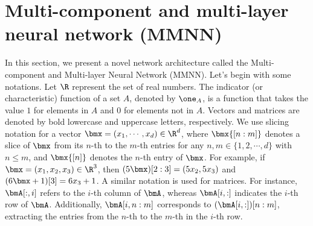 \documentclass[review,hidelinks,onefignum,onetabnum]{siamart250211}
\begin{document}




\section{Multi-component and multi-layer neural network (MMNN)}
\label{sec:MMNN}


In this section, we present a novel network architecture called the Multi-component and Multi-layer Neural Network (MMNN). 
Let's begin with some notations. Let $\R$ represent the set of real numbers. The indicator (or characteristic) function of a set $A$, denoted by $\one_{A}$, is a function that takes the value $1$ for elements in $A$ and $0$ for elements not in $A$. Vectors and matrices are denoted by bold lowercase and uppercase letters, respectively.
We use slicing notation for a vector $\bmx = (x_1, \cdots, x_d) \in \R^d$, where $\bmx{[n:m]}$ denotes a slice of $\bmx$ from its $n$-th to the $m$-th entries for any $n, m \in \{1, 2, \cdots, d\}$ with $n \le m$, and $\bmx{[n]}$ denotes the $n$-th entry of $\bmx$. For example, if $\bmx = (x_1, x_2, x_3) \in \R^3$, then $(5\bmx){[2:3]} = (5x_2, 5x_3)$ and $(6\bmx + 1){[3]} = 6x_3 + 1$. A similar notation is used for matrices. For instance, $\bmA[:, i]$ refers to the $i$-th column of $\bmA$, whereas $\bmA[i, :]$ indicates the $i$-th row of $\bmA$. Additionally, $\bmA[i, n:m]$ corresponds to $(\bmA[i, :])[n:m]$, extracting the entries from the $n$-th to the $m$-th in the $i$-th row.
\end{document}
